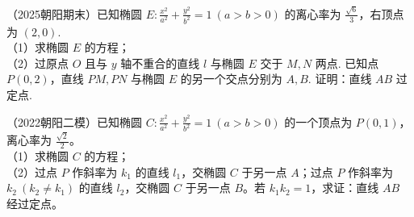 
\begin{example} %
（2025朝阳期末）已知椭圆 $E:\frac{x^2}{a^2}+\frac{y^2}{b^2}=1\ (a>b>0)$ 的离心率为 $\frac{\sqrt{6}}{3}$，右顶点为 $(2,0)$.\\
（1）求椭圆 $E$ 的方程；\\
（2）过原点 $O$ 且与 $y$ 轴不重合的直线 $l$ 与椭圆 $E$ 交于 $M,N$ 两点. 已知点 $P(0,2)$，直线 $PM,PN$ 与椭圆 $E$ 的另一个交点分别为 $A,B$. 证明：直线 $AB$ 过定点.
\end{example}

\begin{example} %
（2022朝阳二模）已知椭圆 $C:\frac{x^2}{a^2}+\frac{y^2}{b^2}=1\ (a>b>0)$ 的一个顶点为 $P(0,1)$，离心率为 $\frac{\sqrt{2}}{2}$。\\
（1）求椭圆 $C$ 的方程；\\
（2）过点 $P$ 作斜率为 $k_1$ 的直线 $l_1$，交椭圆 $C$ 于另一点 $A$；过点 $P$ 作斜率为 $k_2\ (k_2\neq k_1)$ 的直线 $l_2$，交椭圆 $C$ 于另一点 $B$。若 $k_1k_2=1$，求证：直线 $AB$ 经过定点。
\end{example}
